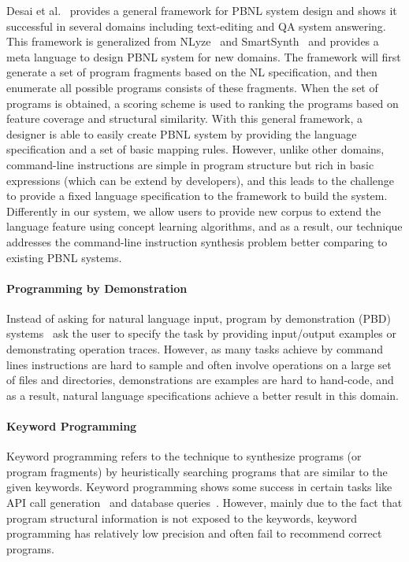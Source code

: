 Desai et al.~\cite{DBLP:journals/corr/DesaiGHJKMRR15} provides a general framework for PBNL system design and shows it successful in several domains including text-editing and QA system answering. This framework is generalized from NLyze~\cite{DBLP:conf/sigmod/GulwaniM14} and SmartSynth~\cite{DBLP:conf/mobisys/LeGS13} and provides a meta language to design PBNL system for new domains. The framework will first generate a set of program fragments based on the NL specification, and then enumerate all possible programs consists of these fragments. When the set of programs is obtained, a scoring scheme is used to ranking the programs based on feature coverage and structural similarity. With this general framework, a designer is able to easily create PBNL system by providing the language specification and a set of basic mapping rules. However, unlike other domains, command-line instructions are simple in program structure but rich in basic expressions (which can be extend by developers), and this leads to the challenge to provide a fixed language specification to the framework to build the system. Differently in our system, we allow users to provide new corpus to extend the language feature using concept learning algorithms, and as a result, our technique addresses the command-line instruction synthesis problem better comparing to existing PBNL systems.

\paragraph{Programming by Demonstration} Instead of asking for natural language input, program by demonstration (PBD) systems~\cite{DBLP:journals/ml/LauWDW03, DBLP:journals/cacm/GulwaniHS12, DBLP:conf/pldi/HarrisG11, DBLP:conf/popl/Gulwani11} ask the user to specify the task by providing input/output examples or demonstrating operation traces. However, as many tasks achieve by command lines instructions are hard to sample and often involve operations on a large set of files and directories, demonstrations are examples are hard to hand-code, and as a result, natural language specifications achieve a better result in this domain.

\paragraph{Keyword Programming} Keyword programming refers to the technique to synthesize programs (or program fragments) by heuristically searching programs that are similar to the given keywords. Keyword programming shows some success in certain tasks like API call generation~\cite{DBLP:journals/ase/LittleM09, DBLP:conf/pldi/MandelinXBK05} and database queries~\cite{DBLP:conf/icde/AgrawalCD02, DBLP:conf/icde/BhalotiaHNCS02}. However, mainly due to the fact that program structural information is not exposed to the keywords, keyword programming has relatively low precision and often fail to recommend correct programs.

